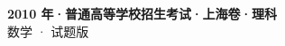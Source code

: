\documentclass[zihao=-4, a4paper]{ctexart}
\begin{document}
\begin{center}
  {\Large\bfseries 2010 年·普通高等学校招生考试·上海卷·理科}\\[4pt]
  {\large 数学 · 试题版}
\end{center}
\medskip
{}

\end{document}
